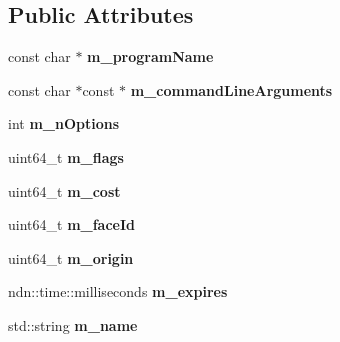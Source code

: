\subsection*{Public Attributes}
\begin{DoxyCompactItemize}
\item 
const char $\ast$ {\bfseries m\+\_\+program\+Name}\hypertarget{classnfdc_1_1Nfdc_a20730ca8aafce5ef966fdbccabb3978b}{}\label{classnfdc_1_1Nfdc_a20730ca8aafce5ef966fdbccabb3978b}

\item 
const char $\ast$const  $\ast$ {\bfseries m\+\_\+command\+Line\+Arguments}\hypertarget{classnfdc_1_1Nfdc_ad98e4c597b9e77f6f6c03bbd17ba8b8d}{}\label{classnfdc_1_1Nfdc_ad98e4c597b9e77f6f6c03bbd17ba8b8d}

\item 
int {\bfseries m\+\_\+n\+Options}\hypertarget{classnfdc_1_1Nfdc_aa1c8b79372608ae19371dbc3c6c3fab5}{}\label{classnfdc_1_1Nfdc_aa1c8b79372608ae19371dbc3c6c3fab5}

\item 
uint64\+\_\+t {\bfseries m\+\_\+flags}\hypertarget{classnfdc_1_1Nfdc_a57b597d3090790bfa476ede000dd99bc}{}\label{classnfdc_1_1Nfdc_a57b597d3090790bfa476ede000dd99bc}

\item 
uint64\+\_\+t {\bfseries m\+\_\+cost}\hypertarget{classnfdc_1_1Nfdc_ad74d372b3902484179140cd7de68360f}{}\label{classnfdc_1_1Nfdc_ad74d372b3902484179140cd7de68360f}

\item 
uint64\+\_\+t {\bfseries m\+\_\+face\+Id}\hypertarget{classnfdc_1_1Nfdc_ae770fe8a351118c87fbbd0ebd5a1a9ea}{}\label{classnfdc_1_1Nfdc_ae770fe8a351118c87fbbd0ebd5a1a9ea}

\item 
uint64\+\_\+t {\bfseries m\+\_\+origin}\hypertarget{classnfdc_1_1Nfdc_ab5cc4398d69e0892d463b30d00a6cdfb}{}\label{classnfdc_1_1Nfdc_ab5cc4398d69e0892d463b30d00a6cdfb}

\item 
ndn\+::time\+::milliseconds {\bfseries m\+\_\+expires}\hypertarget{classnfdc_1_1Nfdc_a6129b1d15b8ddf9dbb12d38a8d86a68f}{}\label{classnfdc_1_1Nfdc_a6129b1d15b8ddf9dbb12d38a8d86a68f}

\item 
std\+::string {\bfseries m\+\_\+name}\hypertarget{classnfdc_1_1Nfdc_ae43ce0fc02d868549679413d14dcfcf7}{}\label{classnfdc_1_1Nfdc_ae43ce0fc02d868549679413d14dcfcf7}

\end{DoxyCompactItemize}
